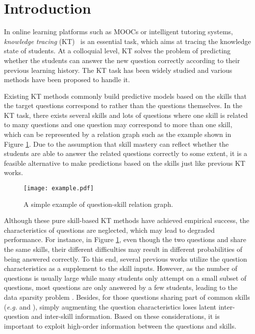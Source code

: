 \documentclass[runningheads]{llncs}
\begin{document}
\section{Introduction}


In online learning platforms such as MOOCs or intelligent tutoring systems, \textit{knowledge tracing} (KT)~\cite{corbett1994knowledge} is an essential task, which aims at tracing the knowledge state of students. At a colloquial level, KT solves the problem of predicting whether the students can answer the new question correctly according to their previous learning history. The KT task has been widely studied and various methods have been proposed to handle it.


Existing KT methods \cite{dkt,dkvmn,d2008more} commonly build predictive models based on the skills that the target questions correspond to rather than the questions themselves. In the KT task, there exists several skills and lots of questions where one skill is related to many questions and one question may correspond to more than one skill, which can be represented by a relation graph such as the example shown in Figure \ref{example}. Due to the assumption that skill mastery can reflect whether the students are able to answer the related questions correctly to some extent, it is a feasible alternative to make predictions based on the skills just like previous KT works.


\begin{figure}
	\centering
	\texttt{[image: example.pdf]}
	\caption{A simple example of question-skill relation graph. } \label{example}
\end{figure}


Although these pure skill-based KT methods have achieved empirical success, the characteristics of questions are neglected, which may lead to degraded performance. For instance, in Figure \ref{example}, even though the two questions  and  share the same skills, their different difficulties may result in different probabilities of being answered correctly. To this end, several previous works \cite{minn2019dynamic} utilize the question characteristics as a supplement to the skill inputs. However, as the number of questions is usually large while many students only attempt on a small subset of questions, most questions are only answered by a few students, leading to the data sparsity problem \cite{dhkt}. Besides, for those questions sharing part of common skills (\textit{e.g.}  and ), simply augmenting the question characteristics loses latent inter-question and inter-skill information. Based on these considerations, it is important to exploit high-order information between the questions and skills.
\end{document}
